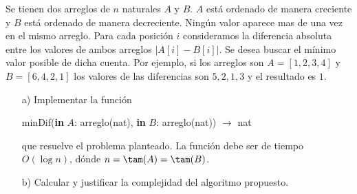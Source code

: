 
Se tienen dos arreglos de $n$ naturales $A$ y $B$. $A$ está ordenado
de manera creciente y $B$ está ordenado de manera decreciente. Ningún valor
aparece mas de una vez en el mismo arreglo.
Para cada posición $i$ consideramos la diferencia absoluta entre los valores de
ambos arreglos $|A[i]-B[i]|$. Se desea buscar el mínimo valor posible de 
dicha cuenta. Por ejemplo, si los arreglos son $A = [1,2,3,4]$ y $B = [6,4,2,1]$
los valores de las diferencias son $5,2,1,3$ y el resultado es $1$.


\begin{enumerate}
\item[a)] Implementar la función
\begin{center}
minDif(\textbf{in} $A$: arreglo(nat), \textbf{in} $B$: arreglo(nat)) $\to$ nat
\end{center}
que resuelve el problema planteado. 
La función debe ser de tiempo $O(\log n)$, dónde $n = \tam(A) = \tam(B)$.
\item[b)] Calcular y justificar la complejidad del algoritmo propuesto. 
\end{enumerate}
